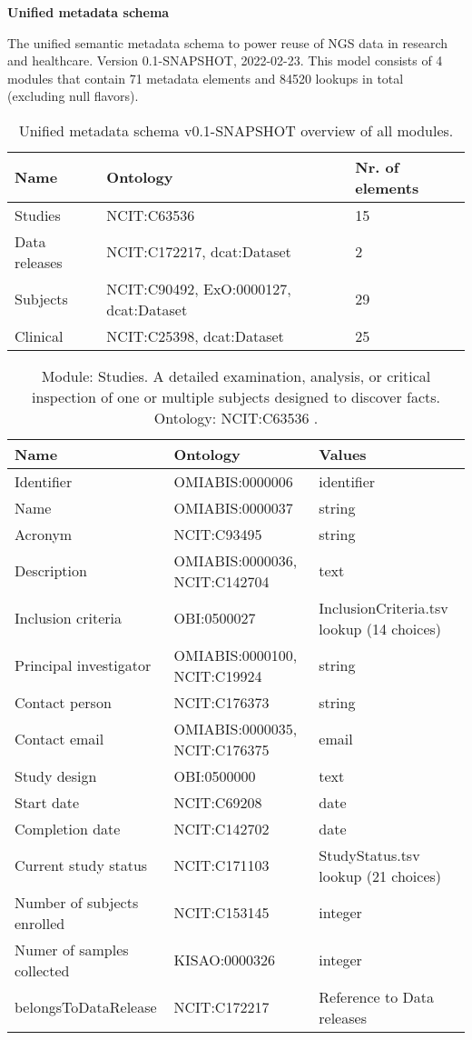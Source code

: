 \documentclass{article}
\begin{document}
\setlength\parindent{0pt}

\textbf{Unified metadata schema}
\newline

The unified semantic metadata schema to power reuse of NGS data in research and healthcare. Version 0.1-SNAPSHOT, 2022-02-23. This model consists of 4 modules that contain 71 metadata elements and 84520 lookups in total (excluding null flavors).

\begin{table}[htb]
\begin{tabular}{lll}
Name & Ontology & Nr. of elements \\
\hline
Studies & NCIT:C63536  & 15 \\
Data releases & NCIT:C172217, dcat:Dataset  & 2 \\
Subjects & NCIT:C90492, ExO:0000127, dcat:Dataset  & 29 \\
Clinical & NCIT:C25398, dcat:Dataset  & 25 \\
\hline
\end{tabular}
\caption[Module overview]{\label{table:table1} Unified metadata schema v0.1-SNAPSHOT overview of all modules.}
\end{table}

\begin{table}[htb]
\begin{tabular}{lll}
Name & Ontology & Values \\
\hline
Identifier & OMIABIS:0000006  & identifier \\
Name & OMIABIS:0000037  & string \\
Acronym & NCIT:C93495  & string \\
Description & OMIABIS:0000036, NCIT:C142704  & text \\
Inclusion criteria & OBI:0500027  & InclusionCriteria.tsv lookup (14 choices) \\
Principal investigator & OMIABIS:0000100, NCIT:C19924  & string \\
Contact person & NCIT:C176373  & string \\
Contact email & OMIABIS:0000035, NCIT:C176375  & email \\
Study design & OBI:0500000  & text \\
Start date & NCIT:C69208  & date \\
Completion date & NCIT:C142702  & date \\
Current study status & NCIT:C171103  & StudyStatus.tsv lookup (21 choices) \\
Number of subjects enrolled & NCIT:C153145  & integer \\
Numer of samples collected & KISAO:0000326  & integer \\
belongsToDataRelease & NCIT:C172217  & Reference to Data releases \\
\hline
\end{tabular}
\caption[Module: Studies]{\label{table:table2} Module: Studies. A detailed examination, analysis, or critical inspection of one or multiple subjects designed to discover facts. Ontology: NCIT:C63536 . }
\end{table}
\end{document}
